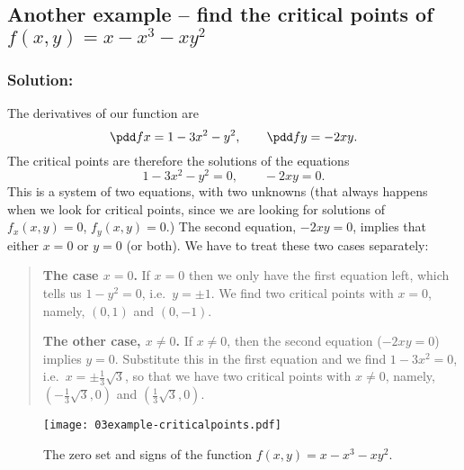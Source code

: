 \subsection{Another example -- find the critical points of $f(x,y) =x-x^3-xy^2$}

\subsubsection*{Solution: }
The derivatives of our function are
\[
\pdd fx = 1-3x^2-y^2,\qquad \pdd fy = -2xy.
\]
The critical points are therefore the solutions of the equations
\[
1-3x^2-y^2=0,\qquad -2xy=0.
\]
This is a system of two equations, with two unknowns (that always happens when
we look for critical points, since we are looking for solutions of $f_x(x,y) =
0$, $f_y(x,y)=0$.)  The second equation, $-2xy=0$, implies that either $x=0$ or
$y=0$ (or both).  We have to treat these two cases separately:
\begin{quote}
  \begin{trivlist}
  \item [\bf The case $x=0$. ] If $x=0$ then we only have the first equation
    left, which tells us $1-y^2=0$, i.e.\ $y=\pm1$.  We find two critical points
    with $x=0$, namely, $(0,1)$ and $(0,-1)$.
  \item [\bf The other case, $x\neq0$. ] If $x\neq0$, then the second equation
    ($-2xy=0$) implies $y=0$.  Substitute this in the first equation and we find
    $1-3x^2=0$, i.e.\ $x=\pm\frac{1} {3}\sqrt{3}$, so that we have two critical
    points with $x\neq0$, namely, $(-\frac13\sqrt3, 0)$ and $(\frac13\sqrt3,
    0)$.
  \end{trivlist}
\end{quote}

\begin{figure}[h]
  \centering
  \texttt{[image: 03example-criticalpoints.pdf]}
  \caption{The zero set and signs of the function $f(x,y) =x-x^3-xy^2$.}
  \label{fig:circle-and-line-zero-set-example}
\end{figure}


